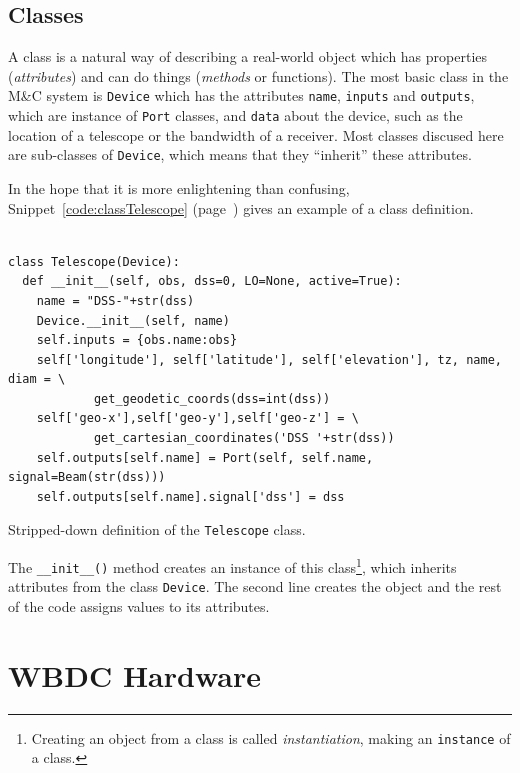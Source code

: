 \documentclass[letterpaper,11pt]{book}
\begin{document}
\section{Classes}

A class is a natural way 
of describing a real-world object which has properties ({\it attributes}) and can
do things ({\it methods} or functions). 
The most basic class in the M\&C system is {\tt Device} which has the attributes 
{\tt name}, {\tt inputs} and {\tt outputs}, which are instance of {\tt Port}
classes, and {\tt data} about the device, such as the location of a telescope
or the bandwidth of a receiver.  Most classes discused here are sub-classes of 
{\tt Device}, which means that they ``inherit'' these attributes.

In the hope that it is more enlightening than confusing, 
Snippet~\ref{code:classTelescope} (page~\pageref{code:classTelescope}) gives an
example of a class definition.
\begin{code}[h!tb]
\begin{center}
\begin{verbatim}
  
class Telescope(Device):
  def __init__(self, obs, dss=0, LO=None, active=True):
    name = "DSS-"+str(dss)
    Device.__init__(self, name)
    self.inputs = {obs.name:obs}
    self['longitude'], self['latitude'], self['elevation'], tz, name, diam = \
            get_geodetic_coords(dss=int(dss))
    self['geo-x'],self['geo-y'],self['geo-z'] = \
            get_cartesian_coordinates('DSS '+str(dss))
    self.outputs[self.name] = Port(self, self.name, signal=Beam(str(dss)))
    self.outputs[self.name].signal['dss'] = dss\end{verbatim}
\caption{\label{code:classTelescope}Stripped-down definition of the 
{\tt Telescope} class.}
\end{center}
\end{code}
The {\tt \_\_init\_\_()} method creates an instance of this 
class\footnote{Creating an object from a class is called {\it instantiation},
making an {\tt instance} of a class.}, which 
inherits attributes from the class {\tt Device}. The second line creates the 
object and the rest of the code assigns values to its attributes.



\chapter{WBDC Hardware}\label{hardware}
\end{document}
